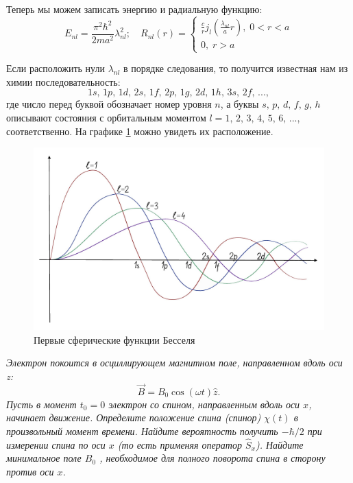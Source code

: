 Теперь мы можем записать энергию и радиальную функцию:
\[
E_{nl} = \frac{\pi^2\hbar^2}{2ma^2}\lambda_{nl}^2;\quad R_{nl}(r) =
\begin{cases}
    \frac{c}{r}j_{l}\left( \frac{\lambda_{nl}}{a}r \right), \; 0 < r < a\\
    0, \; r > a
\end{cases}
\]

Если расположить нули $\lambda_{nl}$ в порядке следования, то получится известная нам из химии последовательность:
\[
1s,\,1p,\,1d,\,2s,\,1f,\,2p,\,1g,\,2d,\,1h,\,3s,\,2f,\, ...,
\]
где число перед буквой обозначает номер уровня $n$, а буквы $s,\,p,\,d,\,f,\,g,\,h$ описывают состояния с орбитальным моментом $l=1,\,2,\,3,\,4,\,5,\,6,\,...$, соответственно. На графике \ref{fig 10.1} можно увидеть их расположение.

\begin{figure}[h!]
\centering
\includegraphics[scale=0.28]{class_10/images/bessel.jpg}
\caption{Первые сферические функции Бесселя}
\label{fig 10.1}
\end{figure}



\begin{center}
    \textit{Электрон покоится в осциллирующем магнитном поле, направленном вдоль оси z:}
    \[
    \vec{B} = B_0\cos(\omega t)\hat{z}.
    \]
    \textit{Пусть в момент $t_0 = 0$ электрон со спином, направленным вдоль оси $x$, начинает движение. Определите положение спина (спинор) $\chi(t)$ в произвольный момент времени. Найдите вероятность получить $-\hbar/2$ при измерении спина по оси $x$ (то есть применяя оператор $\hat{S}_x$). Найдите минимальное поле $B_0$ , необходимое для полного поворота спина в сторону против оси $x$.}
\end{center}

